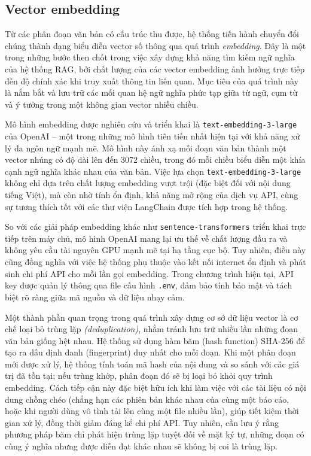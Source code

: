 \subsection{Vector embedding}

Từ các phân đoạn văn bản có cấu trúc thu được, hệ thống tiến hành chuyển đổi chúng thành dạng biểu diễn vector số thông qua quá trình \emph{embedding}. Đây là một trong những bước then chốt trong việc xây dựng khả năng tìm kiếm ngữ nghĩa của hệ thống RAG, bởi chất lượng của các vector embedding ảnh hưởng trực tiếp đến độ chính xác khi truy xuất thông tin liên quan. Mục tiêu của quá trình này là nắm bắt và lưu trữ các mối quan hệ ngữ nghĩa phức tạp giữa từ ngữ, cụm từ và ý tưởng trong một không gian vector nhiều chiều.

Mô hình embedding được nghiên cứu và triển khai là \texttt{text-embedding-3-large} của OpenAI -- một trong những mô hình tiên tiến nhất hiện tại với khả năng xử lý đa ngôn ngữ mạnh mẽ. Mô hình này ánh xạ mỗi đoạn văn bản thành một vector nhúng có độ dài lên đến 3072 chiều, trong đó mỗi chiều biểu diễn một khía cạnh ngữ nghĩa khác nhau của văn bản. Việc lựa chọn \texttt{text-embedding-3-large} không chỉ dựa trên chất lượng embedding vượt trội (đặc biệt đối với nội dung tiếng Việt), mà còn nhờ tính ổn định, khả năng mở rộng của dịch vụ API, cùng sự tương thích tốt với các thư viện LangChain được tích hợp trong hệ thống.

So với các giải pháp embedding khác như \texttt{sentence-transformers} triển khai trực tiếp trên máy chủ, mô hình OpenAI mang lại ưu thế về chất lượng đầu ra và không yêu cầu tài nguyên GPU mạnh mẽ tại hạ tầng cục bộ. Tuy nhiên, điều này cũng đồng nghĩa với việc hệ thống phụ thuộc vào kết nối internet ổn định và phát sinh chi phí API cho mỗi lần gọi embedding. Trong chương trình hiện tại, API key được quản lý thông qua file cấu hình \texttt{.env}, đảm bảo tính bảo mật và tách biệt rõ ràng giữa mã nguồn và dữ liệu nhạy cảm.

Một thành phần quan trọng trong quá trình xây dựng cơ sở dữ liệu vector là cơ chế loại bỏ trùng lặp \emph{(deduplication)}, nhằm tránh lưu trữ nhiều lần những đoạn văn bản giống hệt nhau. Hệ thống sử dụng hàm băm (hash function) SHA-256 để tạo ra dấu định danh (fingerprint) duy nhất cho mỗi đoạn. Khi một phân đoạn mới được xử lý, hệ thống tính toán mã hash của nội dung và so sánh với các giá trị đã tồn tại; nếu trùng khớp, phân đoạn đó sẽ bị loại bỏ khỏi quy trình embedding. Cách tiếp cận này đặc biệt hữu ích khi làm việc với các tài liệu có nội dung chồng chéo (chẳng hạn các phiên bản khác nhau của cùng một báo cáo, hoặc khi người dùng vô tình tải lên cùng một file nhiều lần), giúp tiết kiệm thời gian xử lý, đồng thời giảm đáng kể chi phí API. Tuy nhiên, cần lưu ý rằng phương pháp băm chỉ phát hiện trùng lặp tuyệt đối về mặt ký tự, những đoạn có cùng ý nghĩa nhưng được diễn đạt khác nhau sẽ không bị coi là trùng lặp.

